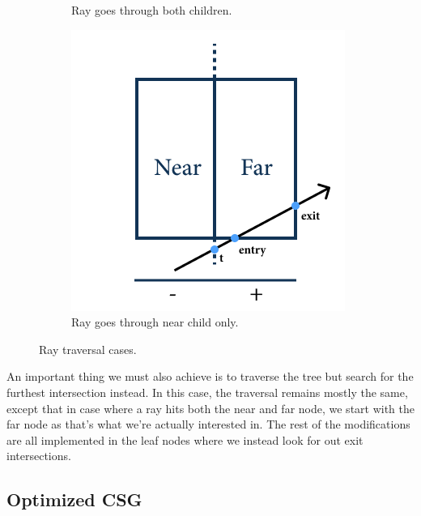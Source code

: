 \documentclass[a4paper,11pt,oneside]{article}
\begin{document}
\begin{figure}[ht]
\begin{subfigure}[b]{0.3\textwidth}
         \caption{Ray goes through both children.}
          \label{sec4.3:both-children}
     \end{subfigure}
     \hfill
     \begin{subfigure}[b]{0.3\textwidth}
         \centering
         \includegraphics[width=\textwidth]{section4/4.3/far-intersection.png}
         \caption{Ray goes through near child only.}
         \label{sec4.3:far-child}
     \end{subfigure}
     \hfill
        \caption{Ray traversal cases.}
        \label{sec4.3:ray-traversal-cases}
\end{figure}


An important thing we must also achieve is to traverse the tree but search for the furthest intersection instead. In this case, the traversal remains mostly the same, except that in case where a ray hits both the near and far node, we start with the far node as that's what we're actually interested in. The rest of the modifications are all implemented in the leaf nodes where we instead look for out exit intersections. 

\subsection{Optimized CSG}
\end{document}
